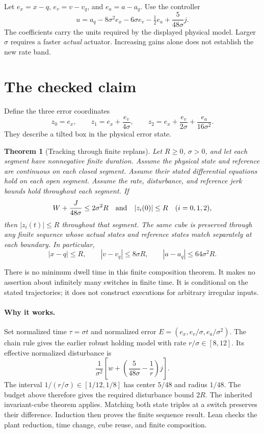 \documentclass[11pt]{article}
\newtheorem{theorem}{Theorem}
\begin{document}
Let $e_x=x-q$, $e_v=v-v_q$, and $e_a=a-a_q$. Use the controller
\begin{equation}\label{eq:control}
 u=a_q-8\sigma^2 e_x-6\sigma e_v-\tfrac12 e_a
       +\frac{5}{48\sigma}j.
\end{equation}
The coefficients carry the units required by the displayed physical model.
Larger $\sigma$ requires a faster \emph{actual} actuator. Increasing gains alone does not establish the new rate band.

\section{The checked claim}
Define the three error coordinates
\[
 z_0=e_x,\qquad z_1=e_x+\frac{e_v}{4\sigma},\qquad
 z_2=e_x+\frac{e_v}{2\sigma}+\frac{e_a}{16\sigma^2}.
\]
They describe a tilted box in the physical error state.

\begin{theorem}[Tracking through finite replans]\label{thm:track}
Let $R\ge0$, $\sigma>0$, and let each segment have nonnegative finite duration.
Assume the physical state and reference are continuous on each closed segment.
Assume their stated differential equations hold on each open segment.
Assume the rate, disturbance, and reference jerk bounds hold throughout each segment.
If
\[
 W+\frac{J}{48\sigma}\le2\sigma^2R
 \quad\hbox{and}\quad |z_i(0)|\le R\quad(i=0,1,2),
\]
then $|z_i(t)|\le R$ throughout that segment.
The same cube is preserved through any finite sequence whose actual states and reference states match separately at each boundary.
In particular,
\[
 |x-q|\le R,\qquad |v-v_q|\le8\sigma R,\qquad
 |a-a_q|\le64\sigma^2R.
\]
\end{theorem}
There is no minimum dwell time in this finite composition theorem.
It makes no assertion about infinitely many switches in finite time.
It is conditional on the stated trajectories; it does not construct executions for arbitrary irregular inputs.

\paragraph{Why it works.}
Set normalized time $\tau=\sigma t$ and normalized error
$E=(e_x,e_v/\sigma,e_a/\sigma^2)$.
The chain rule gives the earlier robust holding model with rate $r/\sigma\in[8,12]$.
Its effective normalized disturbance is
\[
 \frac{1}{\sigma^2}\left[w+
       \left(\frac{5}{48\sigma}-\frac1r\right)j\right].
\]
The interval $1/(r/\sigma)\in[1/12,1/8]$ has center $5/48$ and radius $1/48$.
The budget above therefore gives the required disturbance bound $2R$.
The inherited invariant-cube theorem applies.
Matching both state triples at a switch preserves their difference.
Induction then proves the finite sequence result.
Lean checks the plant reduction, time change, cube reuse, and finite composition.
\end{document}
